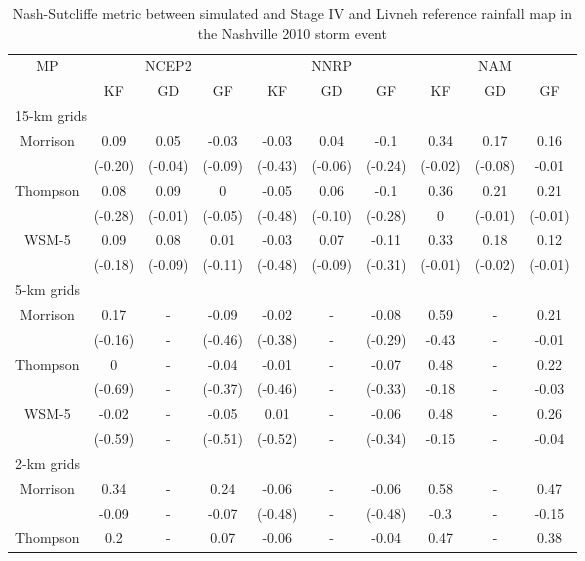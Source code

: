 \begin{table}[htbp]
	\centering
	\caption{Nash-Sutcliffe metric between simulated and Stage IV and Livneh reference rainfall map in the Nashville 2010 storm event}
	\begin{threeparttable}
		\begin{tabular}{cccccccccc}
			\hline
			\multirow{2}{*}{MP} & \multicolumn{3}{c}{NCEP2} & \multicolumn{3}{c}{NNRP} & \multicolumn{3}{c}{NAM}\\
			\cline{2-10}
			& KF & GD & GF & KF & GD & GF & KF & GD & GF\\
			\hline
			\multicolumn{10}{l}{15-km grids}\\
			Morrison & 0.09 & 0.05 & -0.03 & -0.03 & 0.04 & -0.1 & 0.34 & 0.17 & 0.16\\
			& (-0.20) & (-0.04) & (-0.09) & (-0.43) & (-0.06) & (-0.24) & (-0.02) & (-0.08) & -0.01\\
			Thompson & 0.08 & 0.09 & 0 & -0.05 & 0.06 & -0.1 & 0.36 & 0.21 & 0.21\\
			& (-0.28) & (-0.01) & (-0.05) & (-0.48) & (-0.10) & (-0.28) & 0 & (-0.01) & (-0.01)\\
			WSM-5 & 0.09 & 0.08 & 0.01 & -0.03 & 0.07 & -0.11 & 0.33 & 0.18 & 0.12\\
			& (-0.18) & (-0.09) & (-0.11) & (-0.48) & (-0.09) & (-0.31) & (-0.01) & (-0.02) & (-0.01)\\
			\hline
			\multicolumn{10}{l}{5-km grids}\\
			Morrison & 0.17 & - & -0.09 & -0.02 & - & -0.08 & 0.59 & - & 0.21\\
			& (-0.16) & - & (-0.46) & (-0.38) & - & (-0.29) & -0.43 & - & -0.01\\
			Thompson & 0 & - & -0.04 & -0.01 & - & -0.07 & 0.48 & - & 0.22\\
			& (-0.69) & - & (-0.37) & (-0.46) & - & (-0.33) & -0.18 & - & -0.03\\
			WSM-5 & -0.02 & - & -0.05 & 0.01 & - & -0.06 & 0.48 & - & 0.26\\
			& (-0.59) & - & (-0.51) & (-0.52) & - & (-0.34) & -0.15 & - & -0.04\\
			\hline
			\multicolumn{10}{l}{2-km grids}\\
			Morrison & 0.34 & - & 0.24 & -0.06 & - & -0.06 & 0.58 & - & 0.47\\
			& -0.09 & - & -0.07 & (-0.48) & - & (-0.48) & -0.3 & - & -0.15\\
			Thompson & 0.2 & - & 0.07 & -0.06 & - & -0.04 & 0.47 & - & 0.38\\

\end{tabular}
\end{threeparttable}
\end{table}
